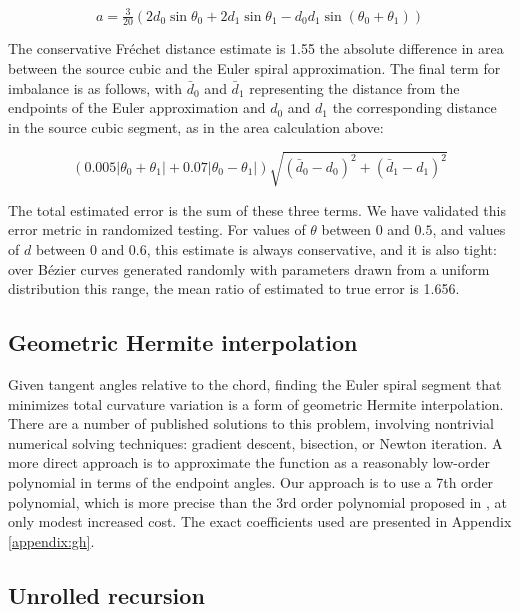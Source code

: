 \documentclass[sigconf, authordraft]{acmart}
\begin{document}
\[
    a = \tfrac{3}{20}(2d_0\sin \theta_0 + 2d_1\sin \theta_1 - d_0 d_1\sin(\theta_0+\theta_1))
\]

The conservative Fréchet distance estimate is 1.55 the absolute difference in area between the source cubic and the Euler spiral approximation. The final term for imbalance is as follows, with $\bar{d}_0$ and $\bar{d}_1$ representing the distance from the endpoints of the Euler approximation and $d_0$ and $d_1$ the corresponding distance in the source cubic segment, as in the area calculation above:

\[
    (0.005|\theta_0+\theta_1| + 0.07|\theta_0 - \theta_1|)\sqrt{(\bar{d}_0 - d_0)^2 + (\bar{d}_1 - d_1)^2}
\]

The total estimated error is the sum of these three terms. We have validated this error metric in randomized testing. For values of $\theta$ between $0$ and $0.5$, and values of $d$ between $0$ and $0.6$, this estimate is always conservative, and it is also tight: over Bézier curves generated randomly with parameters drawn from a uniform distribution this range, the mean ratio of estimated to true error is 1.656.


\subsection{Geometric Hermite interpolation}

Given tangent angles relative to the chord, finding the Euler spiral segment that minimizes total curvature variation is a form of geometric Hermite interpolation. There are a number of published solutions to this problem, involving nontrivial numerical solving techniques: gradient descent\cite{Kimia2003}, bisection\cite{Walton2009}, or Newton iteration\cite{Connor2014}. A more direct approach is to approximate the function as a reasonably low-order polynomial in terms of the endpoint angles. Our approach is to use a 7th order polynomial, which is more precise than the 3rd order polynomial proposed in \cite{Reif2021}, at only modest increased cost. The exact coefficients used are presented in Appendix \ref{appendix:gh}.

\subsection{Unrolled recursion}
\end{document}
